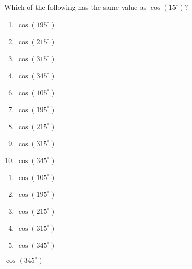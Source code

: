 

  Which of the following has the same value as $\cos(15^\circ)$? 


\ifsat
	\begin{enumerate}[label=\Alph*)]
		\item  $\cos(195^\circ)$ 
		\item $\cos(215^\circ)$ 
		\item $\cos(315^\circ)$ 
		\item $\cos(345^\circ)$ %
	\end{enumerate}
\else
\fi

\ifacteven
	\begin{enumerate}[label=\textbf{\Alph*.},itemsep=\fill,align=left]
		\setcounter{enumii}{5}
		\item    $\cos(105^\circ)$
		\item  $\cos(195^\circ)$ 
		\item $\cos(215^\circ)$ 
		\addtocounter{enumii}{1}
		\item $\cos(315^\circ)$ 
		\item $\cos(345^\circ)$ %
	\end{enumerate}
\else
\fi

\ifactodd
	\begin{enumerate}[label=\textbf{\Alph*.},itemsep=\fill,align=left]
		\item    $\cos(105^\circ)$
		\item  $\cos(195^\circ)$ 
		\item $\cos(215^\circ)$ 
		\item $\cos(315^\circ)$ 
		\item $\cos(345^\circ)$ %
	\end{enumerate}
\else
\fi

\ifgridin
 $\cos(345^\circ)$ %

\else
\fi

